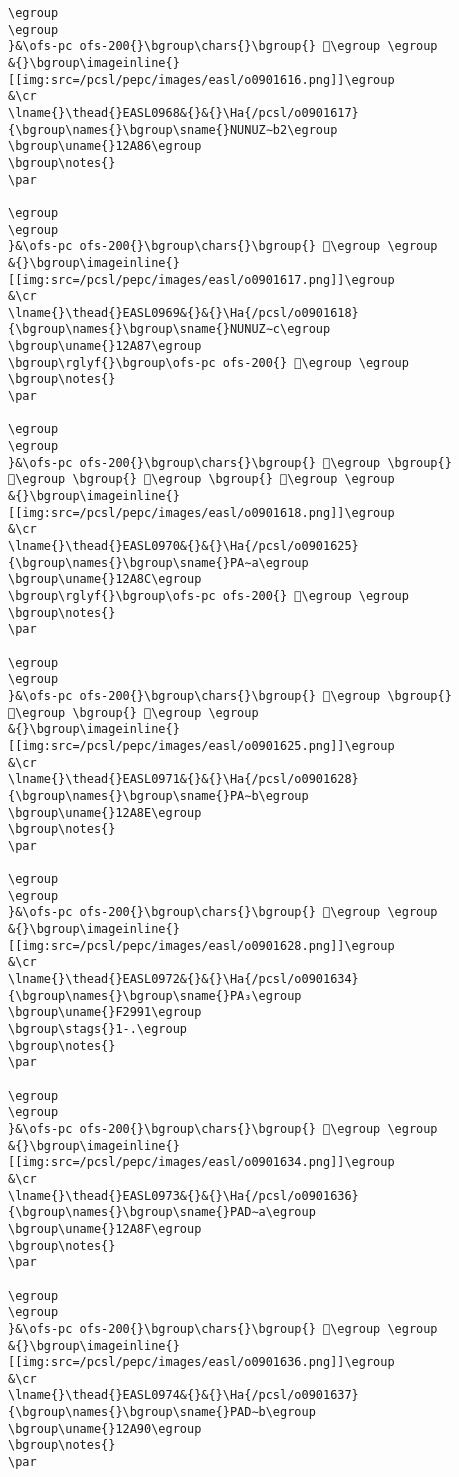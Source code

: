 \begin{verbatim}
\egroup
\egroup
}&\ofs-pc ofs-200{}\bgroup\chars{}\bgroup{} 𒪅\egroup \egroup
&{}\bgroup\imageinline{}[[img:src=/pcsl/pepc/images/easl/o0901616.png]]\egroup
&\cr
\lname{}\thead{}EASL0968&{}&{}\Ha{/pcsl/o0901617}{\bgroup\names{}\bgroup\sname{}NUNUZ∼b2\egroup
\bgroup\uname{}12A86\egroup
\bgroup\notes{}
\par 

\egroup
\egroup
}&\ofs-pc ofs-200{}\bgroup\chars{}\bgroup{} 𒪆\egroup \egroup
&{}\bgroup\imageinline{}[[img:src=/pcsl/pepc/images/easl/o0901617.png]]\egroup
&\cr
\lname{}\thead{}EASL0969&{}&{}\Ha{/pcsl/o0901618}{\bgroup\names{}\bgroup\sname{}NUNUZ∼c\egroup
\bgroup\uname{}12A87\egroup
\bgroup\rglyf{}\bgroup\ofs-pc ofs-200{} 𒪇\egroup \egroup
\bgroup\notes{}
\par 

\egroup
\egroup
}&\ofs-pc ofs-200{}\bgroup\chars{}\bgroup{} 𒪇\egroup \bgroup{} 𒪈\egroup \bgroup{} 𒪉\egroup \bgroup{} 𒪊\egroup \egroup
&{}\bgroup\imageinline{}[[img:src=/pcsl/pepc/images/easl/o0901618.png]]\egroup
&\cr
\lname{}\thead{}EASL0970&{}&{}\Ha{/pcsl/o0901625}{\bgroup\names{}\bgroup\sname{}PA∼a\egroup
\bgroup\uname{}12A8C\egroup
\bgroup\rglyf{}\bgroup\ofs-pc ofs-200{} 𒪌\egroup \egroup
\bgroup\notes{}
\par 

\egroup
\egroup
}&\ofs-pc ofs-200{}\bgroup\chars{}\bgroup{} 𒪋\egroup \bgroup{} 𒪌\egroup \bgroup{} 𒪍\egroup \egroup
&{}\bgroup\imageinline{}[[img:src=/pcsl/pepc/images/easl/o0901625.png]]\egroup
&\cr
\lname{}\thead{}EASL0971&{}&{}\Ha{/pcsl/o0901628}{\bgroup\names{}\bgroup\sname{}PA∼b\egroup
\bgroup\uname{}12A8E\egroup
\bgroup\notes{}
\par 

\egroup
\egroup
}&\ofs-pc ofs-200{}\bgroup\chars{}\bgroup{} 𒪎\egroup \egroup
&{}\bgroup\imageinline{}[[img:src=/pcsl/pepc/images/easl/o0901628.png]]\egroup
&\cr
\lname{}\thead{}EASL0972&{}&{}\Ha{/pcsl/o0901634}{\bgroup\names{}\bgroup\sname{}PA₃\egroup
\bgroup\uname{}F2991\egroup
\bgroup\stags{}1-.\egroup
\bgroup\notes{}
\par 

\egroup
\egroup
}&\ofs-pc ofs-200{}\bgroup\chars{}\bgroup{} 󲦑\egroup \egroup
&{}\bgroup\imageinline{}[[img:src=/pcsl/pepc/images/easl/o0901634.png]]\egroup
&\cr
\lname{}\thead{}EASL0973&{}&{}\Ha{/pcsl/o0901636}{\bgroup\names{}\bgroup\sname{}PAD∼a\egroup
\bgroup\uname{}12A8F\egroup
\bgroup\notes{}
\par 

\egroup
\egroup
}&\ofs-pc ofs-200{}\bgroup\chars{}\bgroup{} 𒪏\egroup \egroup
&{}\bgroup\imageinline{}[[img:src=/pcsl/pepc/images/easl/o0901636.png]]\egroup
&\cr
\lname{}\thead{}EASL0974&{}&{}\Ha{/pcsl/o0901637}{\bgroup\names{}\bgroup\sname{}PAD∼b\egroup
\bgroup\uname{}12A90\egroup
\bgroup\notes{}
\par 


\end{verbatim}
